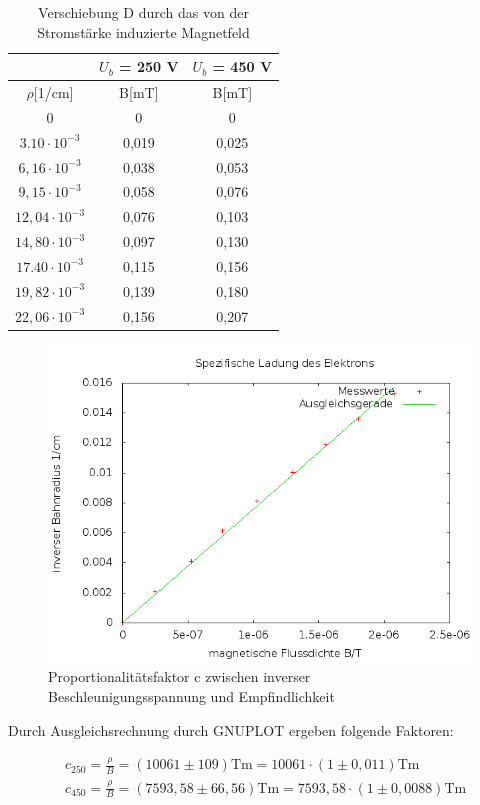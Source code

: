 \renewcommand{\arraystretch}{1.2}
\begin{table}[H]
 \begin{tabular}{c|c|c}
  & $U_b$ = 250 V & $U_b$ = 450 V \\
  \hline
  $\rho$[1/cm] & B[mT] & B[mT]\\
  \hline
  0	&0	&0\\
$3.10\cdot10^{-3}$	&0,019	&0,025\\
$6,16\cdot10^{-3}$	&0,038	&0,053\\
$9,15\cdot10^{-3}$	&0,058	&0,076\\
$12,04\cdot10^{-3}$	&0,076	&0,103\\
$14,80\cdot10^{-3}$	&0,097	&0,130\\
$17.40\cdot10^{-3}$	&0,115	&0,156\\
$19,82\cdot10^{-3}$	&0,139	&0,180\\
$22,06\cdot10^{-3}$	&0,156	&0,207\\
 \end{tabular}
 \caption{Verschiebung D durch das von der Stromstärke induzierte Magnetfeld}
\end{table}
\renewcommand{\arraystretch}{1}

\begin{figure}[H]
\includegraphics[width=1\textwidth] {pics/spezLadung.png}
\centering
\caption{Proportionalitätsfaktor c zwischen inverser Beschleunigungsspannung und Empfindlichkeit}
\end{figure}

Durch Ausgleichsrechnung durch GNUPLOT ergeben folgende Faktoren:

\begin{align}
& c_{250} = \frac{\rho}{B} = (10061 \pm 109) \text{Tm} = 10061\cdot(1 \pm 0,011) \text{Tm} \\
& c_{450} = \frac{\rho}{B} = (7593,58 \pm 66,56) \text{Tm} = 7593,58\cdot(1 \pm 0,0088) \text{Tm} 
\end{align}

